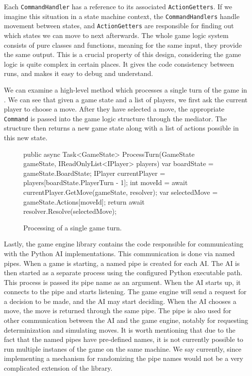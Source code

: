 Each \texttt{CommandHandler} has a reference to its associated \texttt{ActionGetters}.
If we imagine this situation in a state machine context, the \texttt{CommandHandlers}
handle movement between states, and \texttt{ActionGetters} are responsible for
finding out which states we can move to next afterwards. The whole game logic
system consists of pure classes and functions, meaning for the same input,
they provide the same output. This is a crucial property of this design,
considering the game logic is quite complex in certain places. It gives the code
consistency between runs, and makes it easy to debug and understand.

We can examine a high-level method which processes a single turn of the game
in . We can see that given a game state and a list of players,
we first ask the current player to choose a move. After they have selected
a move, the appropriate \texttt{Command} is passed into the game logic
structure through the mediator. The structure then returns a new game state
along with a list of actions possible in this new state.

\begin{figure}[ht]
\begin{code}
public async Task<GameState> ProcessTurn(GameState gameState, 
    IReadOnlyList<IPlayer> players)
{
    var boardState = gameState.BoardState;
    IPlayer currentPlayer = players[boardState.PlayerTurn - 1];
    int moveId = await currentPlayer.GetMove(gameState, resolver);
    var selectedMove = gameState.Actions[moveId];
    return await resolver.Resolve(selectedMove);
}
\end{code}
\caption{Processing of a single game turn.}\label{dd:engineturn}
\end{figure}

Lastly, the game engine library contains the code responsible for communicating
with the Python AI implementations. This communication is done
via named pipes. When a game is starting, a named pipe is created for each
AI. The AI is then started as a separate process using the configured
Python executable path. This process is passed its pipe name
as an argument. When the AI starts up, it connects to the pipe and starts listening.
The game engine will send a request for a decision to be made, and the AI may
start deciding. When the AI chooses a move, the move is returned through
the same pipe. The pipe is also used for other communication between
the AI and the game engine, notably for requesting determinization and
simulating moves. It is worth mentioning that due to the fact that
the named pipes have pre-defined names, it is not currently possible
to run multiple instanes of the game on the same machine. We say currently,
since implementing a mechanism for randomizing the pipe names would
not be a very complicated extension of the library.

